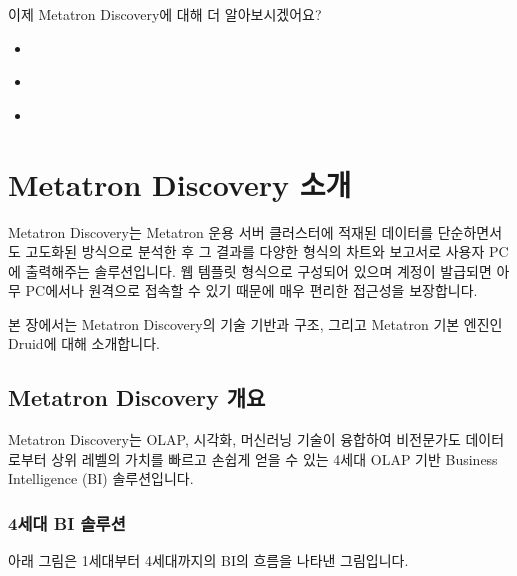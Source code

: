 \documentclass[letterpaper,10pt,english]{sphinxmanual}
\begin{document}
이제 Metatron Discovery에 대해 더 알아보시겠어요?
\begin{itemize}
\item {} 
{\hyperref[\detokenize{discovery/part01/overview::doc}]{}}

\item {} 
{\hyperref[\detokenize{discovery/part01/structure::doc}]{}}

\item {} 
{\hyperref[\detokenize{discovery/part01/engine::doc}]{}}

\end{itemize}


\chapter{Metatron Discovery 소개}
\label{\detokenize{discovery/part01/index:metatron-discovery}}\label{\detokenize{discovery/part01/index::doc}}
Metatron Discovery는 Metatron 운용 서버 클러스터에 적재된 데이터를 단순하면서도 고도화된 방식으로 분석한 후 그 결과를 다양한 형식의 차트와 보고서로 사용자 PC에 출력해주는 솔루션입니다. 웹 템플릿 형식으로 구성되어 있으며 계정이 발급되면 아무 PC에서나 원격으로 접속할 수 있기 때문에 매우 편리한 접근성을 보장합니다.

본 장에서는 Metatron Discovery의 기술 기반과 구조, 그리고 Metatron 기본 엔진인 Druid에 대해 소개합니다.


\section{Metatron Discovery 개요}
\label{\detokenize{discovery/part01/overview:metatron-discovery}}\label{\detokenize{discovery/part01/overview::doc}}
Metatron Discovery는 OLAP, 시각화, 머신러닝 기술이 융합하여 비전문가도 데이터로부터 상위 레벨의 가치를 빠르고 손쉽게 얻을 수 있는 4세대 OLAP 기반 Business Intelligence (BI) 솔루션입니다.
\begin{quote}

\begin{figure}[H]
\centering

\noindent{}
\end{figure}
\end{quote}


\subsection{4세대 BI 솔루션}
\label{\detokenize{discovery/part01/overview:bi}}
아래 그림은 1세대부터 4세대까지의 BI의 흐름을 나타낸 그림입니다.
\begin{quote}

\begin{figure}[H]
\centering

\noindent{}
\end{figure}
\end{quote}
\end{document}
